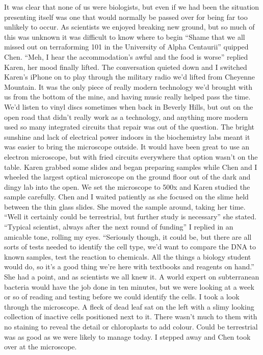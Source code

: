 \documentclass[a4paper]{article}
\begin{document}
It was clear that none of us were biologists, but even if we had been the situation presenting itself was one that would normally be passed over for being far too unlikely to occur. As scientists we enjoyed breaking new ground, but so much of this was unknown it was difficult to know where to begin
“Shame that we all missed out on terraforming 101 in the University of Alpha Centaurii” quipped Chen.
“Meh, I hear the accommodation’s awful and the food is worse” replied Karen, her mood finally lifted.
The conversation quieted down and I switched Karen’s iPhone on to play through the military radio we’d lifted from Cheyenne Mountain. It was the only piece of really modern technology we’d brought with us from the bottom of the mine, and having music really helped pass the time. We’d listen to vinyl discs sometimes when back in Beverly Hills, but out on the open road that didn’t really work as a technology, and anything more modern used so many integrated circuits that repair was out of the question.
The bright sunshine and lack of electrical power indoors in the biochemistry labs meant it was easier to bring the microscope outside. It would have been great to use an electron microscope, but with fried circuits everywhere that option wasn’t on the table. Karen grabbed some slides and began preparing samples while Chen and I wheeled the largest optical microscope on the ground floor out of the dark and dingy lab into the open.
We set the microscope to 500x and Karen studied the sample carefully. Chen and I waited patiently as she focused on the slime held between the thin glass slides. She moved the sample around, taking her time.
“Well it certainly could be terrestrial, but further study is necessary” she stated.
“Typical scientist, always after the next round of funding” I replied in an amicable tone, rolling my eyes.
“Seriously though, it could be, but there are all sorts of tests needed to identify the cell type, we’d want to compare the DNA to known samples, test the reaction to chemicals. All the things a biology student would do, so it’s a good thing we’re here with textbooks and reagents on hand.”
She had a point, and as scientists we all knew it. A world expert on subterranean bacteria would have the job done in ten minutes, but we were looking at a week or so of reading and testing before we could identify the cells.
I took a look through the microscope. A fleck of dead leaf sat on the left with a slimy looking collection of inactive cells positioned next to it. There wasn’t much to them with no staining to reveal the detail or chloroplasts to add colour. Could be terrestrial was as good as we were likely to manage today. I stepped away and Chen took over at the microscope.
\end{document}
